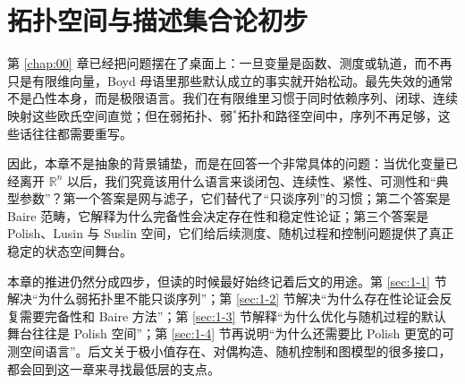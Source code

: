 \chapter{拓扑空间与描述集合论初步}

\label{chap:01}

第 \ref{chap:00} 章已经把问题摆在了桌面上：一旦变量是函数、测度或轨道，而不再只是有限维向量，Boyd 母语里那些默认成立的事实就开始松动。最先失效的通常不是凸性本身，而是极限语言。我们在有限维里习惯于同时依赖序列、闭球、连续映射这些欧氏空间直觉；但在弱拓扑、弱$^\ast$拓扑和路径空间中，序列不再足够，这些话往往都需要重写。

因此，本章不是抽象的背景铺垫，而是在回答一个非常具体的问题：当优化变量已经离开 $\mathbb R^n$ 以后，我们究竟该用什么语言来谈闭包、连续性、紧性、可测性和“典型参数”？第一个答案是网与滤子，它们替代了“只谈序列”的习惯；第二个答案是 Baire 范畴，它解释为什么完备性会决定存在性和稳定性论证；第三个答案是 Polish、Lusin 与 Suslin 空间，它们给后续测度、随机过程和控制问题提供了真正稳定的状态空间舞台。

本章的推进仍然分成四步，但读的时候最好始终记着后文的用途。第 \ref{sec:1-1} 节解决“为什么弱拓扑里不能只谈序列”；第 \ref{sec:1-2} 节解决“为什么存在性论证会反复需要完备性和 Baire 方法”；第 \ref{sec:1-3} 节解释“为什么优化与随机过程的默认舞台往往是 Polish 空间”；第 \ref{sec:1-4} 节再说明“为什么还需要比 Polish 更宽的可测空间语言”。后文关于极小值存在、对偶构造、随机控制和图模型的很多接口，都会回到这一章来寻找最低层的支点。








